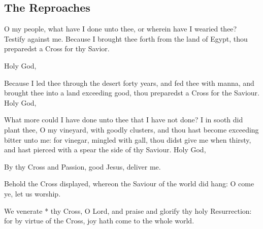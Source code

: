 {\centering{}\par}


\subsection{The Reproaches}

\V O my people, what have I done unto thee, or wherein have I wearied thee? Testify against me.
Because I brought thee forth from the land of Egypt, thou preparedst a Cross for thy Savior.

\centerline{}


 Holy God, \etc


\medskip
\centerline{}

\V Because I led thee through the desert forty years, and fed thee with manna, and brought thee into a land exceeding good, thou preparedst a Cross for the Saviour.  Holy God, \etc

\medskip
\centerline{}

\V What more could I have done unto thee that I have not done? I in sooth did plant thee, O my vineyard, with goodly clusters, and thou hast become exceeding bitter unto me: for vinegar, mingled with gall, thou didst give me when thirsty, and hast pierced with a spear the side of thy Saviour.  Holy God, \etc

\medskip
{}
By thy Cross and Passion, good Jesus, deliver me.

\medskip
{}

 Behold the Cross displayed, whereon the Saviour of the world did hang: O come ye, let us worship.


 We venerate * thy Cross, O Lord, and praise and glorify thy holy Resurrection: for by virtue of the Cross, joy hath come to the whole world.

